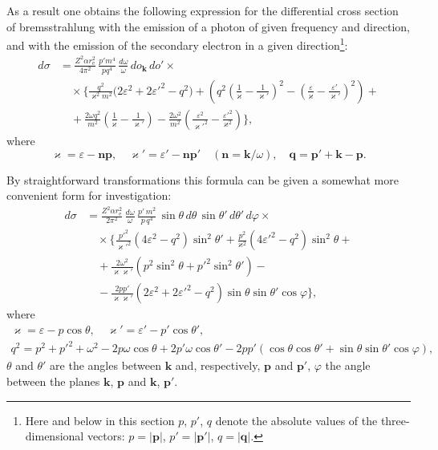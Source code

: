 As a result one obtains the following expression for the differential cross section of bremsstrahlung with the emission of a photon of given frequency and direction, and with the emission of the secondary electron in a given direction\footnote{Here and below in this section $p$, $p'$, $q$ denote the absolute values of the three-dimensional vectors: $p = |\mathbf{p}|$, $p' = |\mathbf{p}'|$, $q = |\mathbf{q}|$.}:
\begin{equation}
\begin{split}
d\sigma &= \frac{Z^2\alpha r_\mathrm{e}^2}{4\pi^2}\,\frac{p'm^4}{pq^4}\,\frac{d\omega}{\omega}\,do_\mathbf{k}\,do' \times {} \\
&\quad \times \biggl\{\frac{q^2}{\varkappa^2 m^2}\bigl(2\varepsilon^2+2\varepsilon'^2 - q^2\bigr) + \left(q^2\left(\frac{1}{\varkappa} - \frac{1}{\varkappa'}\right)^{\!2} - \left(\frac{\varepsilon}{\varkappa} - \frac{\varepsilon'}{\varkappa'}\right)^{\!2}\right) + {} \\
&\quad {} + \frac{2\omega q^2}{m^2}\left(\frac{1}{\varkappa} - \frac{1}{\varkappa'}\right) - \frac{2\omega^2}{m^2}\left(\frac{\varepsilon^2}{\varkappa'^2} - \frac{\varepsilon'^2}{\varkappa^2}\right)\biggr\},
\end{split}
\label{eq:93.7}
\end{equation}
where
\[
\varkappa = \varepsilon - \mathbf{np}, \quad \varkappa' = \varepsilon' - \mathbf{np}' \quad (\mathbf{n} = \mathbf{k}/\omega), \quad \mathbf{q} = \mathbf{p}' + \mathbf{k} - \mathbf{p}.
\]


By straightforward transformations this formula can be given a somewhat more convenient form for investigation:
\begin{equation}
\begin{split}
d\sigma &= \frac{Z^2\alpha r_\mathrm{e}^2}{2\pi^2}\,\frac{d\omega}{\omega}\,\frac{p'\,m^2}{p\,q^4}\,\sin\theta\,d\theta\,\sin\theta'\,d\theta'\,d\varphi \times {} \\
&\quad \times \biggl\{\frac{p'^2}{\varkappa'^2}(4\varepsilon^2 - q^2)\sin^2\theta' + \frac{p^2}{\varkappa^2}(4\varepsilon'^2 - q^2)\sin^2\theta + {} \\
&\quad {} + \frac{2\omega^2}{\varkappa\varkappa'}(p^2\sin^2\theta + p'^2\sin^2\theta') - {} \\
&\quad {} - \frac{2pp'}{\varkappa\varkappa'}(2\varepsilon^2 + 2\varepsilon'^2 - q^2)\sin\theta\sin\theta'\cos\varphi\biggr\},
\end{split}
\label{eq:93.8}
\end{equation}
where
\begin{gather*}
\varkappa = \varepsilon - p\cos\theta, \quad \varkappa' = \varepsilon' - p'\cos\theta', \\
q^2 = p^2 + p'^2 + \omega^2 - 2p\omega\cos\theta + 2p'\omega\cos\theta' - 2pp'(\cos\theta\cos\theta' + \sin\theta\sin\theta'\cos\varphi),
\end{gather*}
$\theta$ and $\theta'$ are the angles between $\mathbf{k}$ and, respectively, $\mathbf{p}$ and $\mathbf{p}'$, $\varphi$ the angle between the planes $\mathbf{k}$, $\mathbf{p}$ and $\mathbf{k}$, $\mathbf{p}'$.

